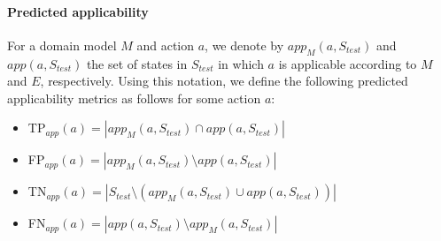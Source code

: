 \documentclass[letterpaper]{article} %
\newcommand{\app}{\ensuremath{\textit{app}}\xspace}
\newcommand{\stest}{\ensuremath{S_{\textit{test}}}\xspace}
\newif\ifaddcomments
\newcommand{\roni}[1]{\ifaddcomments{\textcolor{red}{[Roni: #1]}}\fi}
\newcommand{\gregor}[1]{\ifaddcomments{\textcolor{orange}{[Gregor: #1]}}\fi}
\newcommand{\leo}[1]{\ifaddcomments{\textcolor{pink}{[Leonardo: #1]}}\fi}
\newcommand{\pascalJr}[1]{\ifaddcomments{\textcolor{cyan}{[Pascal L.: {#1}]}}\fi}
\begin{document}
\paragraph{Predicted applicability}
For a domain model $M$ and action $a$, we denote by $\app_M(a,\stest)$ and $\app(a,\stest)$ the set of states in \stest 
in which $a$ is applicable according to $M$ and $E$, respectively. 
Using this notation, we define the following predicted applicability metrics as follows for some action $a$:
\begin{itemize}
    \item TP$_{\app}(a)=|\app_M(a,\stest)\cap \app(a,\stest)|$
    \item FP$_{\app}(a)=|\app_M(a,\stest)\setminus \app(a,\stest)|$ 
    \item TN$_{\app}(a)=|\stest\setminus (\app_M(a,\stest)\cup \app(a,\stest))|$
    \item FN$_{\app}(a)=|\app(a,\stest)\setminus \app_M(a,\stest)|$
\end{itemize}
\end{document}
